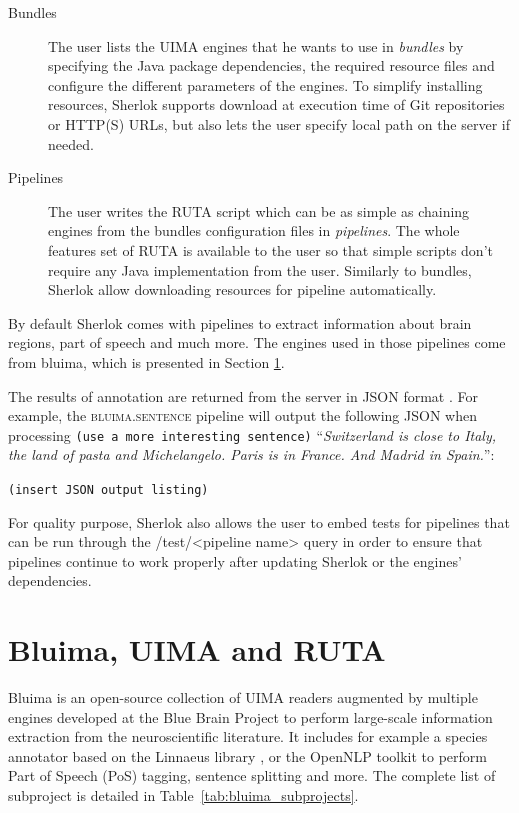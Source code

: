 \documentclass{article}
\newcommand{\ID}[1]{{\textsc{#1}}}
\newcommand{\TODO}[1]{\texttt{\textcolor{YellowOrange}{(#1)}}} %
\newcommand{\REST}[1]{\textsf{#1}}
\begin{document}
\begin{description}
    \item[Bundles] The user lists the UIMA engines that he wants to use in \emph{bundles} by specifying
        the Java package dependencies, the required resource files and configure the different
        parameters of the engines. To simplify installing resources, Sherlok supports download at
        execution time of Git repositories or HTTP(S) URLs, but also lets the user specify local
        path on the server if needed.
    \item[Pipelines] The user writes the RUTA script which can be as simple as chaining engines from
        the bundles configuration files in \emph{pipelines}. The whole features set of RUTA is
        available to the user so that simple scripts don't require any Java implementation from the
        user. Similarly to bundles, Sherlok allow downloading resources for pipeline automatically.
\end{description}

By default Sherlok comes with pipelines to extract information about brain regions, part of speech
and much more. The engines used in those pipelines come from bluima, which is presented in Section
\ref{sec:bluima}.

The results of annotation are returned from the server in JSON format \cite{json}. For example, the
\ID{bluima.sentence} pipeline will output the following JSON when processing \TODO{use a more
interesting sentence} ``\textit{Switzerland is close to Italy, the land of pasta and Michelangelo.
Paris is in France. And Madrid in Spain.}'':

\TODO{insert JSON output listing}

For quality purpose, Sherlok also allows the user to embed tests for pipelines that can be run
through the \REST{/test/<pipeline name>} query in order to ensure that pipelines continue to work
properly after updating Sherlok or the engines' dependencies.

\section{Bluima, UIMA and RUTA}
\label{sec:bluima}

Bluima is an open-source collection of UIMA readers \cite{uima} augmented by multiple engines
developed at the Blue Brain Project \cite{bbp} to perform large-scale information extraction from
the neuroscientific literature. It includes for example a species annotator based on the Linnaeus
library \cite{linnaeus}, or the OpenNLP toolkit \cite{opennlp} to perform Part of Speech (PoS)
tagging, sentence splitting and more. The complete list of subproject is detailed in
Table~\ref{tab:bluima_subprojects}.
\end{document}
